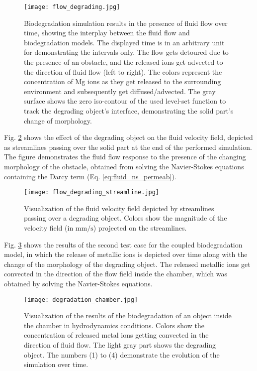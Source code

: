\begin{figure}[h]
\centering
\medskip
\texttt{[image: flow\_degrading.jpg]}
\caption[Biodegradation simulation results in the presence of fluid flow]{Biodegradation simulation results in the presence of fluid flow over time, showing the interplay between the fluid flow and biodegradation models. The displayed time is in an arbitrary unit for demonstrating the intervals only. The flow gets detoured due to the presence of an obstacle, and the released ions get advected to the direction of fluid flow (left to right). The colors represent the concentration of Mg ions as they get released to the surrounding environment and subsequently get diffused/advected. The gray surface shows the zero iso-contour of the used level-set function to track the degrading object's interface, demonstrating the solid part's change of morphology.} \label{fig:fluid_flow_degrading}
\end{figure}

Fig. \ref{fig:fluid_flow_degrading_streamline} shows the effect of the degrading object on the fluid velocity field, depicted as streamlines passing over the solid part at the end of the performed simulation. The figure demonstrates the fluid flow response to the presence of the changing morphology of the obstacle, obtained from solving the Navier-Stokes equations containing the Darcy term (Eq. \ref{eq:fluid_ns_permeab}).


\begin{figure}[h]
\centering
\medskip
\texttt{[image: flow\_degrading\_streamline.jpg]}
\caption[Fluid flow streamlines in the presence of a degrading object]{Visualization of the fluid velocity field depicted by streamlines passing over a degrading object. Colors show the magnitude of the velocity field (in $\mathrm{mm}/\mathrm{s}$) projected on the streamlines.} \label{fig:fluid_flow_degrading_streamline}
\end{figure}


Fig. \ref{fig:fluid_degradation_chamber} shows the results of the second test case for the coupled biodegradation model, in which the release of metallic ions is depicted over time along with the change of the morphology of the degrading object. The released metallic ions get convected in the direction of the flow field inside the chamber, which was obtained by solving the Navier-Stokes equations.


\begin{figure}[h]
\centering
\medskip
\texttt{[image: degradation\_chamber.jpg]}
\caption[Visualization of the biodegradation inside the chamber in the presence of fluid flow]{Visualization of the results of the biodegradation of an object inside the chamber in hydrodynamics conditions. Colors show the concentration of released metal ions getting convected in the direction of fluid flow. The light gray part shows the degrading object. The numbers (1) to (4) demonstrate the evolution of the simulation over time.} \label{fig:fluid_degradation_chamber}
\end{figure}

